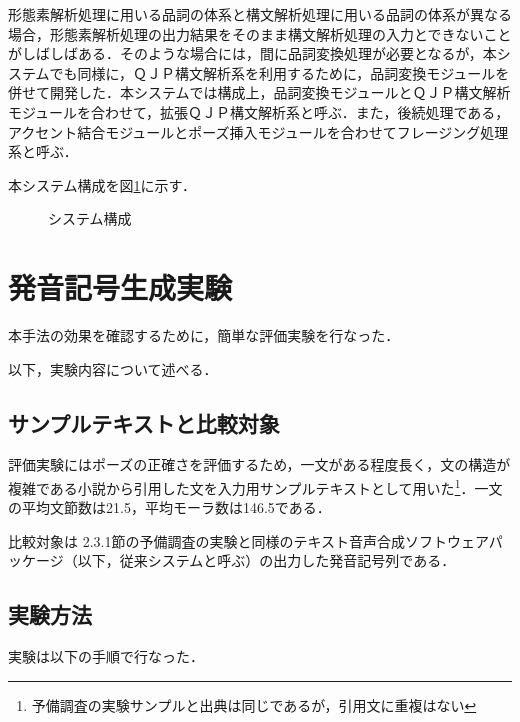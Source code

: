 形態素解析処理に用いる品詞の体系と構文解析処理に用いる品詞の体系が異なる場合，形態素解析処理の出力結果をそのまま構文解析処理の入力とできないことがしばしばある．そのような場合には，間に品詞変換処理が必要となるが，本システムでも同様に，ＱＪＰ構文解析系を利用するために，品詞変換モジュールを併せて開発した\cite{望主1998}．本システムでは構成上，品詞変換モジュールとＱＪＰ構文解析モジュールを合わせて，拡張ＱＪＰ構文解析系と呼ぶ．また，後続処理である，アクセント結合モジュールとポーズ挿入モジュールを合わせてフレージング処理系と呼ぶ．

本システム構成を図\ref{fig:sys}に示す．

\vspace{2.2mm}
\begin{figure}
\begin{center}
\vspace{5mm}
\caption{システム構成}
\label{fig:sys}
\end{center}
\end{figure}

\newpage

\section{発音記号生成実験}\label{sec:test}

本手法の効果を確認するために，簡単な評価実験を行なった．

以下，実験内容について述べる．

\subsection{サンプルテキストと比較対象}

評価実験にはポーズの正確さを評価するため，一文がある程度長く，文の構造が複雑である小説\cite{村上1995}から引用した文を入力用サンプルテキストとして用いた\footnote{予備調査の実験サンプルと出典は同じであるが，引用文に重複はない}．一文の平均文節数は21.5，平均モーラ数は146.5である．

比較対象は 2.3.1節の予備調査の実験と同様のテキスト音声合成\mbox{ソフトウェアパッケージ（以}下，従来システムと呼ぶ）の出力した発音記号列である．

\subsection{実験方法}

実験は以下の手順で行なった．

